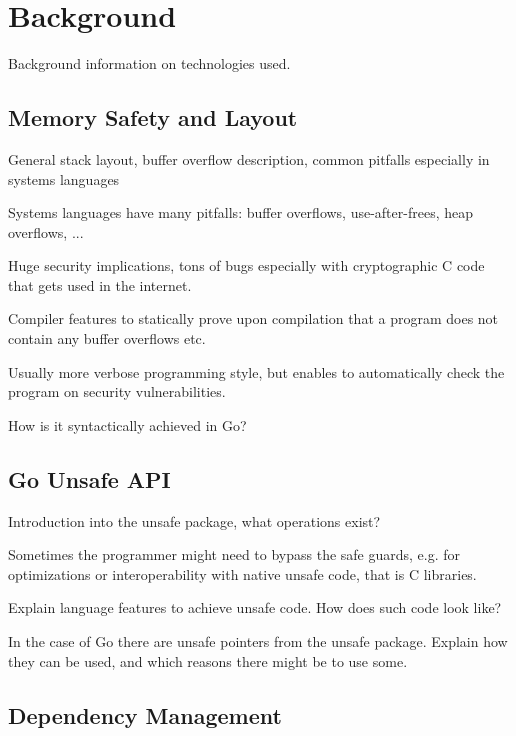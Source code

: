 
\chapter{Background}\label{ch:background}

Background information on technologies used.


\section{Memory Safety and Layout}

General stack layout, buffer overflow description, common pitfalls especially in systems languages




Systems languages have many pitfalls: buffer overflows, use-after-frees, heap overflows, ...

Huge security implications, tons of bugs especially with cryptographic C code that gets
used in the internet.

Compiler features to statically prove upon compilation that a program does not contain any
buffer overflows etc.

Usually more verbose programming style, but enables to automatically check the program
on security vulnerabilities.

How is it syntactically achieved in Go?


\section{Go Unsafe API}

Introduction into the unsafe package, what operations exist?

Sometimes the programmer might need to bypass the safe guards, e.g. for optimizations or
interoperability with native unsafe code, that is C libraries.

Explain language features to achieve unsafe code. How does such code look like?

In the case of Go there are unsafe pointers from the unsafe package. Explain how they
can be used, and which reasons there might be to use some.


\section{Dependency Management}

